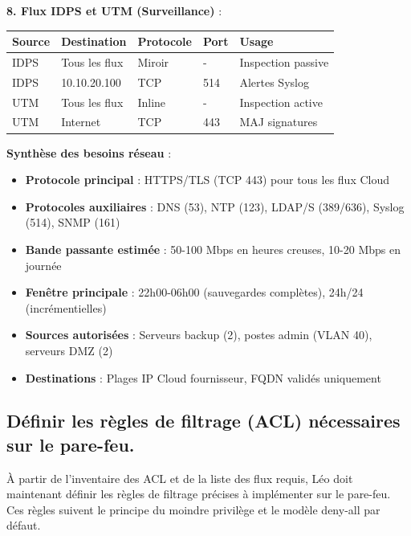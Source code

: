 \medskip

\noindent \textbf{8. Flux IDPS et UTM (Surveillance)} :\\

\vspace{0.5cm}

\begin{tabular}{|l|l|l|l|l|}
\hline
\textbf{Source} & \textbf{Destination} & \textbf{Protocole} & \textbf{Port} & \textbf{Usage} \\ \hline
IDPS & Tous les flux & Miroir & - & Inspection passive \\ \hline
IDPS & 10.10.20.100 & TCP & 514 & Alertes Syslog \\ \hline
UTM & Tous les flux & Inline & - & Inspection active \\ \hline
UTM & Internet & TCP & 443 & MAJ signatures \\ \hline
\end{tabular}

\medskip

\noindent \textbf{Synthèse des besoins réseau} :
\begin{itemize}
  \item \textbf{Protocole principal} : HTTPS/TLS (TCP 443) pour tous les flux Cloud
  \item \textbf{Protocoles auxiliaires} : DNS (53), NTP (123), LDAP/S (389/636), Syslog (514), SNMP (161)
  \item \textbf{Bande passante estimée} : 50-100 Mbps en heures creuses, 10-20 Mbps en journée
  \item \textbf{Fenêtre principale} : 22h00-06h00 (sauvegardes complètes), 24h/24 (incrémentielles)
  \item \textbf{Sources autorisées} : Serveurs backup (2), postes admin (VLAN 40), serveurs DMZ (2)
  \item \textbf{Destinations} : Plages IP Cloud fournisseur, FQDN validés uniquement
\end{itemize}

\newpage

\subsection*{Définir les règles de filtrage (ACL) nécessaires sur le pare-feu.}
{}

À partir de l'inventaire des ACL et de la liste des flux requis, Léo doit maintenant définir les règles de filtrage précises à implémenter sur le pare-feu. Ces règles suivent le principe du moindre privilège et le modèle deny-all par défaut.

